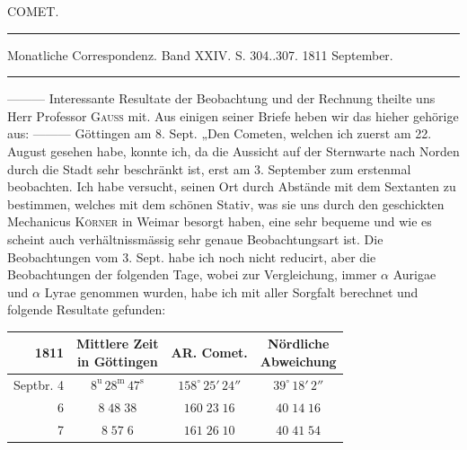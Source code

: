 \par\bigskip
{}
\hypertarget{native-340-lower}{}\label{native-340-lower}
\begin{center}\large COMET.\end{center}
\begin{center}\parbox{.86\linewidth}{\centering\footnotesize\frenchspacing
\hrule height .3pt\relax\vspace{2.5pt}
Monatliche Correspondenz. Band XXIV. S. 304..307. 1811 September.\par
\vspace{2.5pt}\hrule height .3pt\relax
}\end{center}

\par\indent ---\;---\;--- Interessante Resultate der Beobachtung und der Rechnung theilte uns Herr Professor \textsc{Gauss} mit. Aus einigen seiner Briefe heben wir das hieher gehörige aus: ---\;---\;--- Göttingen am 8. Sept. „Den Cometen, welchen ich zuerst am 22. August gesehen habe, konnte ich, da die Aussicht auf der Sternwarte nach Norden durch die Stadt sehr beschränkt ist, erst am 3. September zum erstenmal beobachten. Ich habe versucht, seinen Ort durch Abstände mit dem Sextanten zu bestimmen, welches mit dem schönen Stativ, was sie uns durch den geschickten Mechanicus \textsc{Körner} in Weimar besorgt haben, eine sehr bequeme und wie es scheint auch verhältnissmässig sehr genaue Beobachtungsart ist. Die Beobachtungen vom 3. Sept. habe ich noch nicht reducirt, aber die Beobachtungen der folgenden Tage, wobei zur Vergleichung, immer $\alpha$ Aurigae und $\alpha$ Lyrae genommen wurden, habe ich mit aller Sorgfalt berechnet und folgende Resultate gefunden:
\begin{center}\fontsize{10}{12}\selectfont\setlength{\tabcolsep}{4pt}\renewcommand{\arraystretch}{1.15}\begin{tabular}{r|c|c|c}
1811 & \shortstack{Mittlere Zeit\\in Göttingen} & AR. Comet. & \shortstack{Nördliche\\Abweichung}\\\hline
Septbr. 4 & $8^{\mathrm u}\,28^{\mathrm m}\,47^{\mathrm s}$ & $158^\circ\,25'\,24''$ & $39^\circ\,18'\,2''$\\
6 & $8\;48\;38$ & $160\;23\;16$ & $40\;14\;16$\\
7 & $8\;57\;6$ & $161\;26\;10$ & $40\;41\;54$\\
\end{tabular}\end{center}


